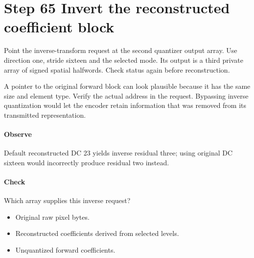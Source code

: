 \section{Step 65 Invert the reconstructed coefficient block}\label{h263-block-s05}
Point the inverse-transform request at the second quantizer output array.
Use direction one, stride sixteen and the selected mode. Its output is a third
private array of signed spatial halfwords. Check status again before reconstruction.

A pointer to the original forward block can look plausible because it has the
same size and element type. Verify the actual address in the request. Bypassing
inverse quantization would let the encoder retain information that was removed
from its transmitted representation.

\paragraph{Observe} Default reconstructed DC 23 yields inverse residual three;
using original DC sixteen would incorrectly produce residual two instead.
\paragraph{Check} Which array supplies this inverse request?
\begin{itemize}
  \item[A.] Original raw pixel bytes.
  \item[B.] Reconstructed coefficients derived from selected levels.
  \item[C.] Unquantized forward coefficients.
\end{itemize}
